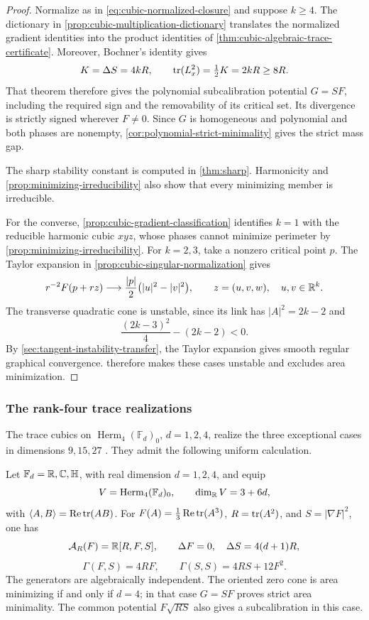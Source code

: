 \begin{proof}
Normalize as in \eqref{eq:cubic-normalized-closure} and suppose
\(k\geq4\). The dictionary in
\cref{prop:cubic-multiplication-dictionary} translates the normalized
gradient identities into the product identities of
\cref{thm:cubic-algebraic-trace-certificate}. Moreover, Bochner's
identity gives
\[
 K=\Delta S=4kR,\qquad
 \operatorname{tr}(L_x^2)=\tfrac12K=2kR\geq8R.
\]
That theorem therefore gives the polynomial subcalibration potential
\(G=SF\), including the required sign and the removability of its
critical set. Its divergence is strictly signed wherever \(F\ne0\).
Since \(G\) is homogeneous and polynomial and both phases are nonempty,
\cref{cor:polynomial-strict-minimality} gives the strict mass gap.

The sharp stability constant is computed in \cref{thm:sharp}.
Harmonicity and \cref{prop:minimizing-irreducibility} also show that
every minimizing member is irreducible.

For the converse, \cref{prop:cubic-gradient-classification} identifies
\(k=1\) with the reducible harmonic cubic \(xyz\), whose phases cannot
minimize perimeter by \cref{prop:minimizing-irreducibility}.
For \(k=2,3\), take a nonzero critical point \(p\).
The Taylor expansion in \cref{prop:cubic-singular-normalization} gives
\[
 r^{-2}F(p+rz)\longrightarrow
 \frac{|p|}{2}\bigl(|u|^2-|v|^2\bigr),
 \qquad z=(u,v,w),\quad u,v\in\mathbb R^k.
\]
The transverse quadratic cone is unstable, since its link has
\(|A|^2=2k-2\) and
\[
 \frac{(2k-3)^2}{4}-(2k-2)<0.
\]
By \cref{sec:tangent-instability-transfer}, the Taylor expansion gives
smooth regular graphical convergence. 
therefore makes these cases unstable and excludes area minimization.
\end{proof}

\subsubsection{The rank-four trace realizations}

The trace cubics on $\operatorname{Herm}_4(\mathbb F_d)_0$,
$d=1,2,4$, realize the three exceptional cases in dimensions
$9,15,27$ \cite[Section~6.11.6(iii)]{NadirashviliTkachevVladut14}.
They admit the following uniform calculation.

\begin{corollary}
\label{cor:quaternionic-trace-cubic}
Let \(\mathbb F_d=\mathbb R,\mathbb C,\mathbb H\), with real dimension
\(d=1,2,4\), and equip
\[
 V=\operatorname{Herm}_4(\mathbb F_d)_0,\qquad
 \dim_{\mathbb R}V=3+6d,
\]
with \(\langle A,B\rangle=\operatorname{Re}\operatorname{tr}(AB)\).
For \(F(A)=\tfrac13\operatorname{Re}\operatorname{tr}(A^3)\),
\(R=\operatorname{tr}(A^2)\), and \(S=|\nabla F|^2\), one has
\[
 \mathcal A_R(F)=\mathbb R[R,F,S],\qquad
 \Delta F=0,\quad \Delta S=4(d+1)R,
\]
\[
 \Gamma(F,S)=4RF,\qquad \Gamma(S,S)=4RS+12F^2.
\]
The generators are algebraically independent. The oriented zero cone
is area minimizing if and only if \(d=4\); in that case \(G=SF\)
proves strict area minimality. The common potential \(F\sqrt{RS}\)
also gives a subcalibration in this case.
\end{corollary}

